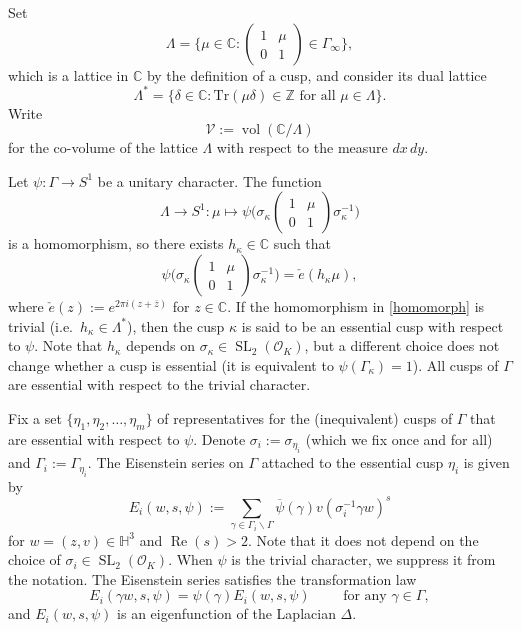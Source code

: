\documentclass[12pt,reqno]{amsart}
\numberwithin{equation}{section}
\renewcommand{\Re}{\operatorname{Re}}
\newcommand{\C}{\mathbb{C}}
\DeclareMathOperator{\vol}{vol}
\DeclareMathOperator{\SL}{SL}
\renewcommand{\pmatrix}[4]{\left(\begin{smallmatrix}#1 & #2 \\ #3 & #4\end{smallmatrix}\right)}
\begin{document}
Set 
\begin{equation*}
    \Lambda=\Big \{ \mu \in \mathbb{C}:   \pmatrix 1 \mu 0 1  \in \Gamma_\infty \Big \},
\end{equation*}
which is a lattice in $\C$ by the definition of a cusp, and consider its dual lattice 
\begin{equation*}
    \Lambda^{*} = \Big \{ \delta \in \mathbb{C}: \mathrm{Tr}(\mu \delta) \in \mathbb{Z} \text{ for all } \mu \in \Lambda \Big\}. 
\end{equation*}
Write
\begin{equation} \label{voldef}
    \mathcal{V}:=\vol(\mathbb{C}/\Lambda)
\end{equation}
for the co-volume of the lattice $\Lambda$ with respect to the measure $dx \, dy$.

Let $\psi: \Gamma \to S^1$
be a unitary character. The function
\begin{equation*}
    \Lambda \to S^1: \mu \mapsto \psi \big(\sigma_{\kappa} \pmatrix {1} {\mu} {0} {1}\sigma^{-1}_{\kappa} \big)
\end{equation*}
is a homomorphism, so there exists $h_{\kappa} \in \mathbb{C}$ such that
\begin{equation} \label{homomorph}
    \psi \big(\sigma_{\kappa} \pmatrix {1} {\mu} {0} {1}\sigma^{-1}_{\kappa} \big) =\check{e}(h_{\kappa} \mu ),
\end{equation}
where $\check{e}(z):=e^{2 \pi i (z+\overline{z})}$ for $z \in \mathbb{C}$.
If the homomorphism in \eqref{homomorph} is trivial (i.e.\ $h_{\kappa}\in \Lambda^*$), then the cusp $\kappa$ is said 
to be an essential cusp with respect to $\psi$. Note that $h_\kappa$ depends on $\sigma_\kappa \in \SL_2(\mathcal{O}_K)$, but a different choice does not change whether a cusp is essential (it is equivalent to $\psi(\Gamma_\kappa) = 1$). All cusps of $\Gamma$ are essential with respect to the trivial character.

Fix a set $\{\eta_1, \eta_2, \dots, \eta_m\}$ of representatives for the (inequivalent) cusps of $\Gamma$
that are essential with respect to $\psi$. Denote $\sigma_i := \sigma_{\eta_i}$ (which we fix once and for all) and $\Gamma_i := \Gamma_{\eta_i}$. 
The Eisenstein series on $\Gamma$ attached to the
essential cusp $\eta_i$ is given by 
\begin{equation} \label{eisdef}
    E_{i}(w,s,\psi):=\sum_{\gamma \in \Gamma_{i} \backslash \Gamma } \overline{\psi}(\gamma) v(\sigma_{i}^{-1} \gamma w)^s
\end{equation}
for $w=(z, v) \in \mathbb{H}^3$ and $\Re(s)>2$. Note that it does not depend on the choice of $\sigma_i \in \SL_2(\mathcal{O}_K)$. When $\psi$ is the trivial character, we suppress it from the notation.
The Eisenstein series satisfies the transformation law
\begin{equation*}
    E_{i}(\gamma w,s,\psi)=\psi(\gamma) E_{i}(w,s,\psi) \qquad \text{ for any } \gamma \in \Gamma,
\end{equation*}
and $E_{i}(w,s,\psi)$ is an eigenfunction of the Laplacian $\Delta$.
\end{document}

